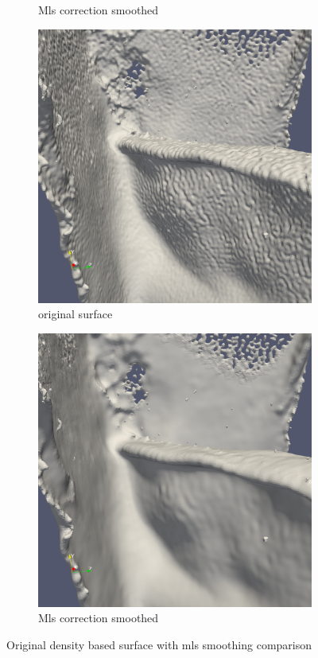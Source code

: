 \begin{figure}
\begin{center}
\begin{subfigure}[b]{0.47\textwidth}
			\caption{Mls correction smoothed}
		\end{subfigure}
		\begin{subfigure}[b]{0.47\textwidth}
			\includegraphics[width=\textwidth]{figures/DDMOriginal2.png}
			\caption{original surface}
		\end{subfigure}
		\begin{subfigure}[b]{0.47\textwidth}
			\includegraphics[width=\textwidth]{figures/DDMMls2.png}
			\caption{Mls correction smoothed}
		\end{subfigure}
	\end{center}
	\caption{Original density based surface with mls smoothing comparison} \label{fig:db_mls_reconstruction1}
\end{figure}
